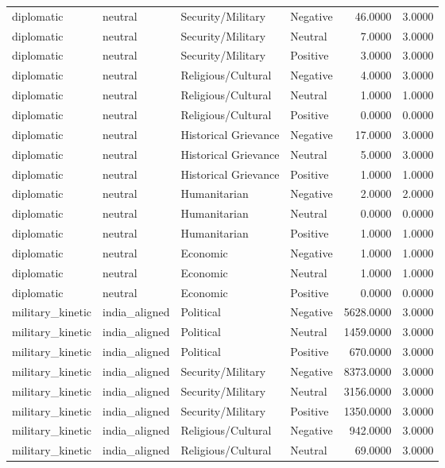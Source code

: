\begin{longtable}{llllrr}
diplomatic & neutral & Security/Military & Negative & 46.0000 & 3.0000 \\
diplomatic & neutral & Security/Military & Neutral & 7.0000 & 3.0000 \\
diplomatic & neutral & Security/Military & Positive & 3.0000 & 3.0000 \\
diplomatic & neutral & Religious/Cultural & Negative & 4.0000 & 3.0000 \\
diplomatic & neutral & Religious/Cultural & Neutral & 1.0000 & 1.0000 \\
diplomatic & neutral & Religious/Cultural & Positive & 0.0000 & 0.0000 \\
diplomatic & neutral & Historical Grievance & Negative & 17.0000 & 3.0000 \\
diplomatic & neutral & Historical Grievance & Neutral & 5.0000 & 3.0000 \\
diplomatic & neutral & Historical Grievance & Positive & 1.0000 & 1.0000 \\
diplomatic & neutral & Humanitarian & Negative & 2.0000 & 2.0000 \\
diplomatic & neutral & Humanitarian & Neutral & 0.0000 & 0.0000 \\
diplomatic & neutral & Humanitarian & Positive & 1.0000 & 1.0000 \\
diplomatic & neutral & Economic & Negative & 1.0000 & 1.0000 \\
diplomatic & neutral & Economic & Neutral & 1.0000 & 1.0000 \\
diplomatic & neutral & Economic & Positive & 0.0000 & 0.0000 \\
military\_kinetic & india\_aligned & Political & Negative & 5628.0000 & 3.0000 \\
military\_kinetic & india\_aligned & Political & Neutral & 1459.0000 & 3.0000 \\
military\_kinetic & india\_aligned & Political & Positive & 670.0000 & 3.0000 \\
military\_kinetic & india\_aligned & Security/Military & Negative & 8373.0000 & 3.0000 \\
military\_kinetic & india\_aligned & Security/Military & Neutral & 3156.0000 & 3.0000 \\
military\_kinetic & india\_aligned & Security/Military & Positive & 1350.0000 & 3.0000 \\
military\_kinetic & india\_aligned & Religious/Cultural & Negative & 942.0000 & 3.0000 \\
military\_kinetic & india\_aligned & Religious/Cultural & Neutral & 69.0000 & 3.0000 \\

\end{longtable}
